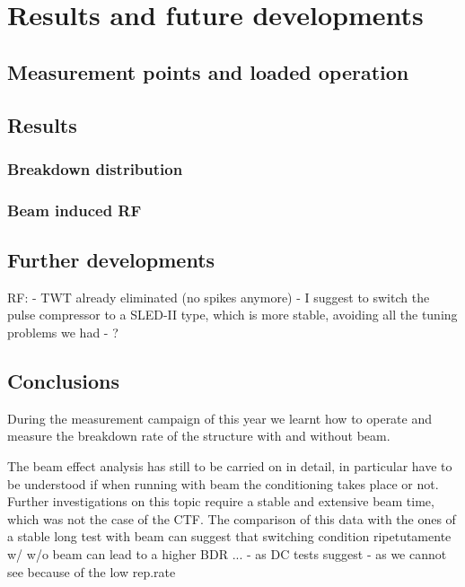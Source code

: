\chapter[Results and future developments]{Results and future developments}

\section[Measurement points and loaded operation]{Measurement points and loaded operation}



\section[Results]{Results}

\subsection[Breakdown distribution]{Breakdown distribution}



\subsection[Beam induced RF]{Beam induced RF}




\section[Further developments]{Further developments}


RF:
- TWT already eliminated (no spikes anymore)
- I suggest to switch the pulse compressor to a SLED-II type, which is more stable, avoiding all the tuning problems we had
- ?


\section{Conclusions}

During the measurement campaign of this year we learnt how to operate and measure the breakdown rate of the structure with and without beam.

The beam effect analysis has still to be carried on in detail, in particular have to be understood if when running with beam the conditioning takes place or not. Further investigations on this topic require a stable and extensive beam time, which was not the case of the CTF. The comparison of this data with the ones of a stable long test with beam can suggest that switching condition ripetutamente w/ w/o beam can lead to a higher BDR ...
- as DC tests suggest
- as we cannot see because of the low rep.rate